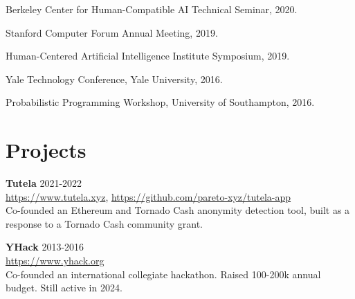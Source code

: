 \documentclass[margin, 10pt]{res} %
\begin{document}
\begin{resume}
Berkeley Center for Human-Compatible AI Technical Seminar, 2020.

Stanford Computer Forum Annual Meeting, 2019.

Human-Centered Artificial Intelligence Institute Symposium, 2019.

Yale Technology Conference, Yale University, 2016.

Probabilistic Programming Workshop, University of Southampton, 2016.


\section{Projects}

\textbf{Tutela} \hfill 2021-2022 \\
\url{https://www.tutela.xyz}, \url{https://github.com/pareto-xyz/tutela-app} \\
Co-founded an Ethereum and Tornado Cash anonymity detection tool, built as a response to a Tornado Cash community grant.

\textbf{YHack} \hfill 2013-2016 \\
\url{https://www.yhack.org} \\
Co-founded an international collegiate hackathon. Raised 100-200k annual budget. Still active in 2024.

\end{resume}
\end{document}

